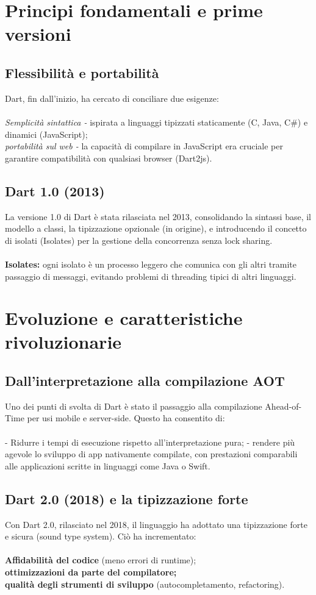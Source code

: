 \documentclass[14pt]{extbook}
\begin{document}
\section{Principi fondamentali e prime versioni}
\subsection{Flessibilità e portabilità}
Dart, fin dall’inizio, ha cercato di conciliare due esigenze:\\\\
\textit{Semplicità sintattica -} ispirata a linguaggi tipizzati staticamente (C, Java, C\#) e dinamici (JavaScript);\\
\textit{portabilità sul web -} la capacità di compilare in JavaScript era cruciale per garantire compatibilità con qualsiasi browser (Dart2js).\\

\subsection{Dart 1.0 (2013)}
La versione 1.0 di Dart è stata rilasciata nel 2013, consolidando la sintassi base, il modello a classi, la tipizzazione opzionale (in origine), e introducendo il concetto di isolati (Isolates) per la gestione della concorrenza senza lock sharing.\\\\
\textbf{Isolates:} ogni isolato è un processo leggero che comunica con gli altri tramite passaggio di messaggi, evitando problemi di threading tipici di altri linguaggi.
\pagebreak

\section{Evoluzione e caratteristiche rivoluzionarie}
\subsection{Dall’interpretazione alla compilazione AOT}
Uno dei punti di svolta di Dart è stato il passaggio alla compilazione Ahead-of-Time per usi mobile e server-side. Questo ha consentito di:\\\\
- Ridurre i tempi di esecuzione rispetto all’interpretazione pura;
- rendere più agevole lo sviluppo di app nativamente compilate, con prestazioni comparabili alle applicazioni scritte in linguaggi come Java o Swift.

\subsection{Dart 2.0 (2018) e la tipizzazione forte}
Con Dart 2.0, rilasciato nel 2018, il linguaggio ha adottato una tipizzazione forte e sicura (sound type system). Ciò ha incrementato:\\\\
\textbf{Affidabilità del codice} (meno errori di runtime);\\
\textbf{ottimizzazioni da parte del compilatore;}\\
\textbf{qualità degli strumenti di sviluppo} (autocompletamento, refactoring).\\
\end{document}
